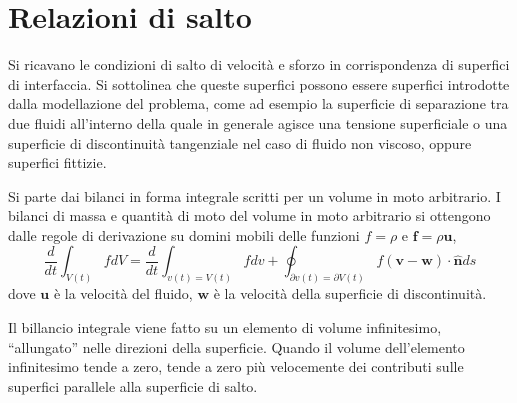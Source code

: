 \section{Relazioni di salto}

Si ricavano le condizioni di salto di velocità e sforzo in corrispondenza di superfici di interfaccia.
 Si sottolinea che queste superfici possono essere superfici introdotte dalla modellazione del problema,
 come ad esempio la superficie di separazione tra due fluidi all'interno della quale in generale agisce
 una tensione superficiale o una superficie di discontinuità tangenziale nel caso di fluido non viscoso,
 oppure superfici fittizie.
 
Si parte dai bilanci in forma integrale scritti per un volume in moto arbitrario. I bilanci di massa e quantità di moto
 del volume in moto arbitrario si ottengono dalle regole di derivazione su domini mobili delle funzioni
 $f = \rho$ e $\bm{f} = \rho \bm{u}$,
\begin{equation}
 \frac{d}{dt} \int_{V(t)} f dV 
    = \frac{d}{dt} \int_{v(t)=V(t)} f dv + \oint_{\partial v(t)=\partial V(t)} f(\bm{v}-\bm{w}) \cdot \bm{\hat{n}} ds 
\end{equation}
dove $\bm{u}$ è la velocità del fluido, $\bm{w}$ è la velocità della superficie di discontinuità.

Il billancio integrale viene fatto su un elemento di volume infinitesimo, ``allungato'' nelle direzioni della superficie.
 Quando il volume dell'elemento infinitesimo tende a zero, tende a zero più velocemente dei contributi sulle superfici
 parallele alla superficie di salto.
 
\begin{figure}[h]
\centering
 \qquad \qquad
{}
\end{figure}

